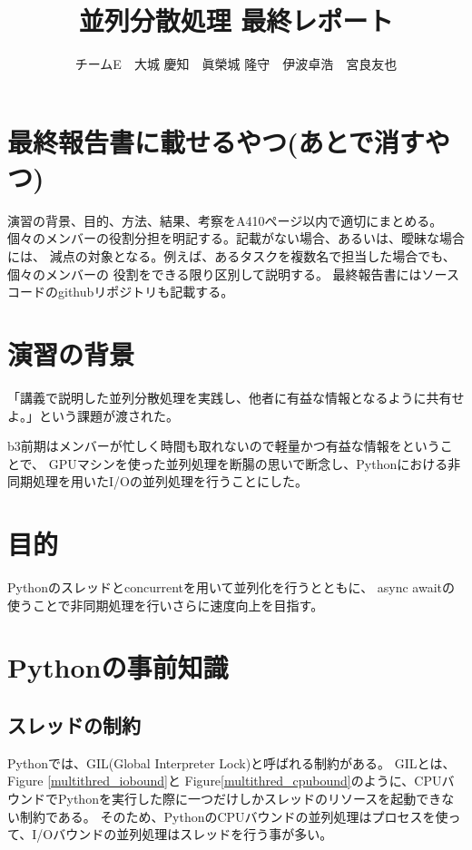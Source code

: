 \documentclass[14pt, oneside]{article}     	%
\title{並列分散処理  最終レポート}
\author{チームE　大城 慶知　眞榮城 隆守　伊波卓浩　宮良友也}
\begin{document}
\maketitle

\section*{最終報告書に載せるやつ(あとで消すやつ)}

演習の背景、目的、方法、結果、考察をA410ページ以内で適切にまとめる。
個々のメンバーの役割分担を明記する。記載がない場合、あるいは、曖昧な場合には、
減点の対象となる。例えば、あるタスクを複数名で担当した場合でも、個々のメンバーの
役割をできる限り区別して説明する。
最終報告書にはソースコードのgithubリポジトリも記載する。

\section{演習の背景}
「講義で説明した並列分散処理を実践し、他者に有益な情報となるように共有せよ。」という課題が渡された。

b3前期はメンバーが忙しく時間も取れないので軽量かつ有益な情報をということで、
GPUマシンを使った並列処理を断腸の思いで断念し、Pythonにおける非同期処理を用いたI/Oの並列処理を行うことにした。

\section{目的}
Pythonのスレッドとconcurrentを用いて並列化を行うとともに、
async awaitの使うことで非同期処理を行いさらに速度向上を目指す。


\section{Pythonの事前知識}

\subsection{スレッドの制約}
Pythonでは、GIL(Global Interpreter Lock)と呼ばれる制約がある。
GILとは、Figure \ref{multithred_iobound}と Figure\ref{multithred_cpubound}のように、CPUバウンドでPythonを実行した際に一つだけしかスレッドのリソースを起動できない制約である。
そのため、PythonのCPUバウンドの並列処理はプロセスを使って、I/Oバウンドの並列処理はスレッドを行う事が多い。
\end{document}
